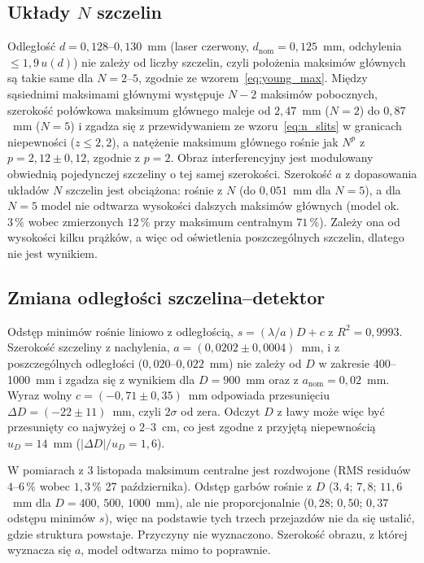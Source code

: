 \documentclass[12pt, a4paper]{article}
\begin{document}
\subsection{Układy $N$ szczelin}

Odległość $d = 0{,}128$--$0{,}130$~mm (laser czerwony, $d_\text{nom} = 0{,}125$~mm, odchylenia
$\le 1{,}9\,u(d)$) nie zależy od liczby szczelin, czyli położenia maksimów głównych są takie same
dla $N = 2$--$5$, zgodnie ze wzorem~\eqref{eq:young_max}. Między sąsiednimi maksimami głównymi
występuje $N - 2$ maksimów pobocznych, szerokość połówkowa maksimum głównego maleje od
$2{,}47$~mm ($N = 2$) do $0{,}87$~mm ($N = 5$) i zgadza się z przewidywaniem ze
wzoru~\eqref{eq:n_slits} w granicach niepewności ($z \le 2{,}2$), a natężenie maksimum głównego
rośnie jak $N^p$ z $p = 2{,}12 \pm 0{,}12$, zgodnie z $p = 2$. Obraz interferencyjny jest
modulowany obwiednią pojedynczej szczeliny o tej samej szerokości. Szerokość $a$ z dopasowania
układów $N$ szczelin jest obciążona: rośnie z $N$ (do $0{,}051$~mm dla $N = 5$), a dla $N = 5$
model nie odtwarza wysokości dalszych maksimów głównych (model ok.\ $3\,\%$ wobec zmierzonych
$12\,\%$ przy maksimum centralnym $71\,\%$). Zależy ona od wysokości kilku prążków, a więc od
oświetlenia poszczególnych szczelin, dlatego nie jest wynikiem.

\subsection{Zmiana odległości szczelina--detektor}

Odstęp minimów rośnie liniowo z odległością, $s = (\lambda/a)D + c$ z $R^2 = 0{,}9993$.
Szerokość szczeliny z nachylenia, $a = (0{,}0202 \pm 0{,}0004)$~mm, i z poszczególnych odległości
($0{,}020$--$0{,}022$~mm) nie zależy od $D$ w zakresie 400--1000~mm i zgadza się z wynikiem
dla $D = 900$~mm oraz z $a_\text{nom} = 0{,}02$~mm. Wyraz wolny $c = (-0{,}71 \pm 0{,}35)$~mm
odpowiada przesunięciu $\Delta D = (-22 \pm 11)$~mm, czyli $2\sigma$ od zera. Odczyt $D$ z ławy
może więc być przesunięty co najwyżej o $2$--$3$~cm, co jest zgodne z przyjętą niepewnością
$u_D = 14$~mm ($|\Delta D|/u_D = 1{,}6$).

W pomiarach z 3 listopada maksimum centralne jest rozdwojone (RMS residuów $4$--$6\,\%$ wobec
$1{,}3\,\%$ 27 października). Odstęp garbów rośnie z $D$ ($3{,}4$; $7{,}8$; $11{,}6$~mm dla
$D = 400$, $500$, $1000$~mm), ale nie proporcjonalnie ($0{,}28$; $0{,}50$; $0{,}37$ odstępu
minimów $s$), więc na podstawie tych trzech przejazdów nie da się ustalić, gdzie struktura
powstaje. Przyczyny nie wyznaczono. Szerokość obrazu, z której wyznacza się $a$, model
odtwarza mimo to poprawnie.
\end{document}
